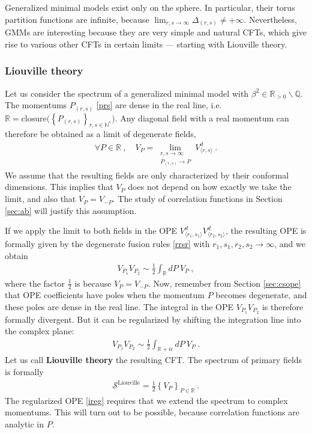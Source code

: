 \documentclass[12pt, a4paper]{article}
\newcommand{\myindex}[1]{\textbf{\boldmath #1}}
\theoremstyle{break}
\begin{document}
Generalized minimal models exist only on the sphere. In particular, their torus partition functions are infinite, because $\lim_{r,s\to\infty} \Delta_{(r,s)}\neq +\infty$. Nevertheless, GMMs are interesting because they are very simple and natural CFTs, which give rise to various other CFTs in certain limits --- starting with Liouville theory.

\subsubsection{Liouville theory}\label{sec:liou}

Let us consider the spectrum of a generalized minimal model with $\beta^2\in\mathbb{R}_{>0}\backslash\mathbb{Q}$. The momentums $P_{(r,s)}$ \eqref{prs} are dense in the real line, i.e. $\mathbb{R}=\text{closure}\big(\left\{ P_{(r,s)}\right\}_{r,s\in\mathbb{N}^*}\big)$. Any diagonal field with a real momentum can therefore be obtained as a limit of degenerate fields,
\begin{align}
 \forall P\in\mathbb{R}\ , \quad V_P = \lim_{\substack{r,s\to\infty \\ P_{(r,s)}\to P}} V^d_{\langle r,s\rangle}\ .
 \label{vplim}
\end{align}
We assume that the resulting fields are only characterized by their conformal dimensions. This implies that $V_P$ does not depend on how exactly we take the limit, and also that $V_P=V_{-P}$. The study of correlation functions in Section \ref{sec:ab} will justify this assumption.

If we apply the limit to both fields in the OPE $V^d_{\langle r_1,s_1\rangle}V^d_{\langle r_2,s_2\rangle}$, the resulting OPE is formally given by the degenerate fusion rules \eqref{rrsr} with $r_1,s_1,r_2,s_2\to\infty$, and we obtain
\begin{align}
 \boxed{V_{P_1}V_{P_2} \sim \frac12 \int_\mathbb{R} dP\ V_P} \ ,
 \label{idpv}
\end{align}
where the factor $\frac12$ is because $V_P=V_{-P}$. Now, remember from Section \ref{sec:csope} that OPE coefficients have poles when the momentum $P$ becomes degenerate, and these poles are dense in the real line. The integral in the OPE $V_{P_1}V_{P_2}$ is therefore formally divergent. But it can be regularized by shifting the integration line into the complex plane:
\begin{align}
 V_{P_1}V_{P_2} \sim \frac12 \int_{\mathbb{R}+i\epsilon} dP\ V_P\ .
 \label{ireg}
\end{align}
Let us call \myindex{Liouville theory} the resulting CFT. The spectrum of primary fields is formally
\begin{align}
 \boxed{\mathcal{S}^\text{Liouville} = \frac12 \left\{ V_P\right\}_{P\in \mathbb{R}}}\ .
 \label{sliou}
\end{align}
The regularized OPE \eqref{ireg} requires that we extend the spectrum to complex momentums. This will turn out to be possible, because correlation functions are analytic in $P$. 
\end{document}
